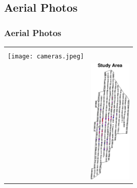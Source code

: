 \documentclass[mathserif,compress]{beamer}
\begin{document}
 

\subsection{Aerial Photos}
\begin{frame} 
\frametitle{Aerial Photos}
     
	\begin{tabular} {p{5.8cm} p{3.8cm}}

		{
		\begin{center}
		  \vspace{-.5cm}
			\texttt{[image: airplane.jpeg]}  \\
		  \vspace{.5cm}
			\texttt{[image: cameras.jpeg]} \\
		\end{center}
		} &
		{
			\vspace{-.5cm}
			\includegraphics[width=2.0cm]{RawPlotsColoredCrop.pdf} 
		}

	\end{tabular}

\end{frame}

\end{document}
